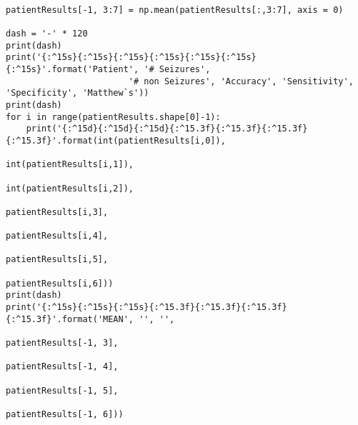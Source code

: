 \documentclass[11pt]{article}
\begin{document}
\begin{verbatim}
    
patientResults[-1, 3:7] = np.mean(patientResults[:,3:7], axis = 0)

dash = '-' * 120
print(dash)
print('{:^15s}{:^15s}{:^15s}{:^15s}{:^15s}{:^15s}{:^15s}'.format('Patient', '# Seizures', 
                        '# non Seizures', 'Accuracy', 'Sensitivity', 'Specificity', 'Matthew`s'))
print(dash)
for i in range(patientResults.shape[0]-1):
    print('{:^15d}{:^15d}{:^15d}{:^15.3f}{:^15.3f}{:^15.3f}{:^15.3f}'.format(int(patientResults[i,0]), 
                                                                             int(patientResults[i,1]), 
                                                                             int(patientResults[i,2]), 
                                                                             patientResults[i,3], 
                                                                             patientResults[i,4], 
                                                                             patientResults[i,5],
                                                                             patientResults[i,6]))
print(dash)
print('{:^15s}{:^15s}{:^15s}{:^15.3f}{:^15.3f}{:^15.3f}{:^15.3f}'.format('MEAN', '', '', 
                                                                         patientResults[-1, 3], 
                                                                         patientResults[-1, 4], 
                                                                         patientResults[-1, 5],
                                                                         patientResults[-1, 6]))
\end{verbatim}
\newpage
\end{document}
